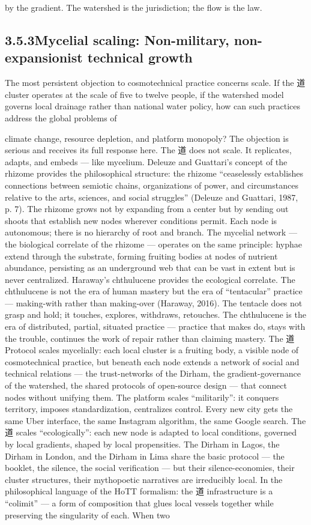 by the gradient. The watershed is the jurisdiction; the flow is the law.

\subsection{3.5.3\quad Mycelial scaling: Non-military, non-expansionist technical growth}

The most persistent objection to cosmotechnical practice concerns scale. If the 道 cluster operates at the scale of five to twelve people, if the watershed model governs local drainage rather than national water policy, how can such practices address the global problems of

climate change, resource depletion, and platform monopoly? The objection is serious and receives its full response here. The 道 does not scale. It replicates, adapts, and embeds — like mycelium. Deleuze and Guattari’s concept of the rhizome provides the philosophical structure: the rhizome “ceaselessly establishes connections between semiotic chains, organizations of power, and circumstances relative to the arts, sciences, and social struggles” (Deleuze and Guattari, 1987, p. 7). The rhizome grows not by expanding from a center but by sending out shoots that establish new nodes wherever conditions permit. Each node is autonomous; there is no hierarchy of root and branch. The mycelial network — the biological correlate of the rhizome — operates on the same principle: hyphae extend through the substrate, forming fruiting bodies at nodes of nutrient abundance, persisting as an underground web that can be vast in extent but is never centralized. Haraway’s chthulucene provides the ecological correlate. The chthulucene is not the era of human mastery but the era of “tentacular” practice — making-with rather than making-over (Haraway, 2016). The tentacle does not grasp and hold; it touches, explores, withdraws, retouches. The chthulucene is the era of distributed, partial, situated practice — practice that makes do, stays with the trouble, continues the work of repair rather than claiming mastery. The 道 Protocol scales mycelially: each local cluster is a fruiting body, a visible node of cosmotechnical practice, but beneath each node extends a network of social and technical relations — the trust-networks of the Dirham, the gradient-governance of the watershed, the shared protocols of open-source design — that connect nodes without unifying them. The platform scales “militarily”: it conquers territory, imposes standardization, centralizes control. Every new city gets the same Uber interface, the same Instagram algorithm, the same Google search. The 道 scales “ecologically”: each new node is adapted to local conditions, governed by local gradients, shaped by local propensities. The Dirham in Lagos, the Dirham in London, and the Dirham in Lima share the basic protocol — the booklet, the silence, the social verification — but their silence-economies, their cluster structures, their mythopoetic narratives are irreducibly local. In the philosophical language of the HoTT formalism: the 道 infrastructure is a “colimit” — a form of composition that glues local vessels together while preserving the singularity of each. When two 